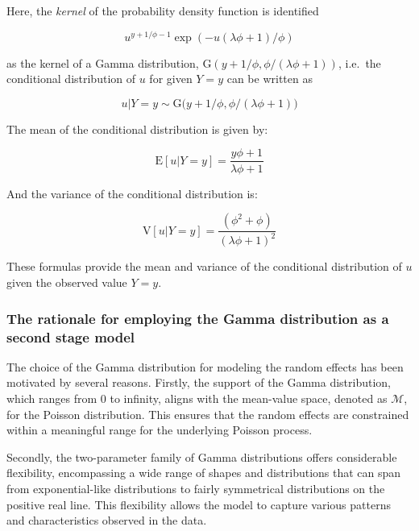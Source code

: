 \documentclass[preprint, 3p, authoryear]{elsarticle} %
\begin{document}
Here, the \textit{kernel} of the probability density function is identified

\begin{equation}
  u^{y+1/\phi-1} \exp (- u(\lambda\phi+1)/\phi)
\end{equation}

as the kernel of a Gamma distribution, \(\mathrm{G}(y+1/\phi,\phi/(\lambda\phi+1))\), i.e.~the conditional distribution of \(u\) for given \(Y=y\) can be written as

\begin{equation}
  u| Y=y\sim \mathrm{G}\big(y+1/\phi,\phi/(\lambda \phi+1)\big)
\end{equation}

The mean of the conditional distribution is given by:

\begin{equation}
  \mathrm{E}[u|Y=y]=\frac{y\phi+1}{\lambda \phi+1}
\end{equation}

And the variance of the conditional distribution is:

\begin{equation}
  \mathrm{V}[u|Y=y]=\frac{( \phi^2+\phi)}{(\lambda \phi + 1)^2}
\end{equation}

These formulas provide the mean and variance of the conditional distribution of \(u\) given the observed value \(Y=y\).

\hypertarget{the-rationale-for-employing-the-gamma-distribution-as-a-second-stage-model}{%
\subsubsection{The rationale for employing the Gamma distribution as a second stage model}\label{the-rationale-for-employing-the-gamma-distribution-as-a-second-stage-model}}

The choice of the Gamma distribution for modeling the random effects has been motivated by several reasons. Firstly, the support of the Gamma distribution, which ranges from 0 to infinity, aligns with the mean-value space, denoted as \(\mathcal{M}\), for the Poisson distribution. This ensures that the random effects are constrained within a meaningful range for the underlying Poisson process.

Secondly, the two-parameter family of Gamma distributions offers considerable flexibility, encompassing a wide range of shapes and distributions that can span from exponential-like distributions to fairly symmetrical distributions on the positive real line. This flexibility allows the model to capture various patterns and characteristics observed in the data.
\end{document}
